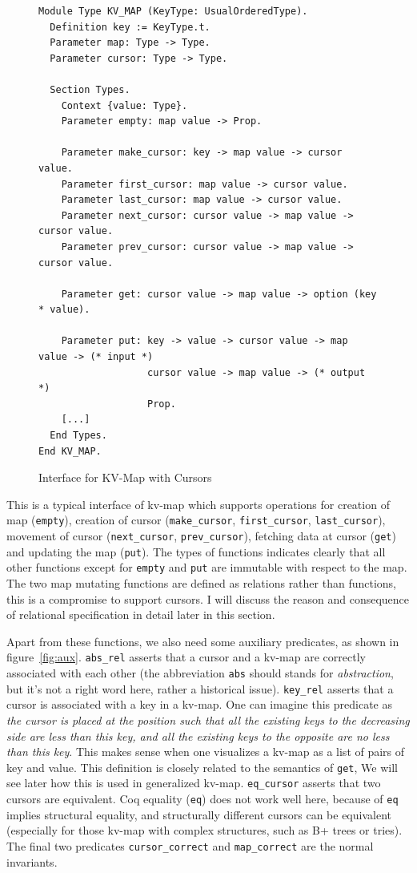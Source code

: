 \documentclass[runningheads]{llncs}
\begin{document}
\begin{figure}[htbp]
  \centering
  \begin{verbatim}
Module Type KV_MAP (KeyType: UsualOrderedType).
  Definition key := KeyType.t.
  Parameter map: Type -> Type.
  Parameter cursor: Type -> Type.

  Section Types.
    Context {value: Type}.
    Parameter empty: map value -> Prop.

    Parameter make_cursor: key -> map value -> cursor value.
    Parameter first_cursor: map value -> cursor value.
    Parameter last_cursor: map value -> cursor value.
    Parameter next_cursor: cursor value -> map value -> cursor value.
    Parameter prev_cursor: cursor value -> map value -> cursor value.
    
    Parameter get: cursor value -> map value -> option (key * value).

    Parameter put: key -> value -> cursor value -> map value -> (* input *)
                   cursor value -> map value -> (* output *)
                   Prop.
    [...]
  End Types.
End KV_MAP.
\end{verbatim}
  \caption{Interface for KV-Map with Cursors}\label{fig:interface}
\end{figure}

This is a typical interface of kv-map which supports operations for creation of
map (\texttt{empty}), creation of cursor (\texttt{make\_cursor},
\texttt{first\_cursor}, \texttt{last\_cursor}), movement of cursor
(\texttt{next\_cursor}, \texttt{prev\_cursor}), fetching data at
cursor (\texttt{get}) and updating the map (\texttt{put}). The types of
functions indicates clearly that all other functions except for \texttt{empty}
and \texttt{put} are immutable with respect to the map. The two map mutating
functions are defined as relations rather than functions, this is a compromise
to support cursors. I will discuss the reason and consequence of relational
specification in detail later in this section.

Apart from these functions, we also need some auxiliary predicates, as shown in
figure~\ref{fig:aux}. \texttt{abs\_rel} asserts that a cursor and a kv-map are
correctly associated with each other (the abbreviation \texttt{abs} should
stands for \emph{abstraction}, but it's not a right word here, rather a
historical issue). \texttt{key\_rel} asserts that a cursor is associated with
a key in a kv-map. One can imagine this predicate as \textit{the cursor is placed
at the position such that all the existing keys to the decreasing side are less
than this key, and all the existing keys to the opposite are no less than this
key}. This makes sense when one visualizes a kv-map as a list of pairs of key and
value. This definition is closely related to the semantics of \texttt{get}, We
will see later how this is used in generalized kv-map. \texttt{eq\_cursor}
asserts that two cursors are equivalent. Coq equality (\texttt{eq}) does not
work well here, because of \texttt{eq} implies structural equality, and
structurally different cursors can be equivalent (especially for those kv-map
with complex structures, such as B+ trees or tries). The final two predicates
\texttt{cursor\_correct} and \texttt{map\_correct} are the normal invariants.
\end{document}
